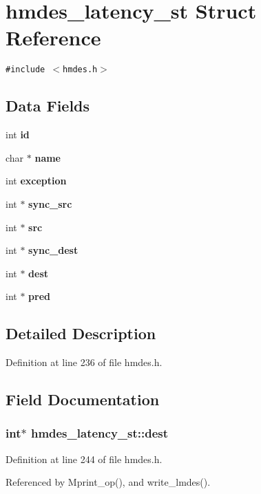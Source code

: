 \section{hmdes\_\-latency\_\-st Struct Reference}
\label{structhmdes__latency__st}
{\tt \#include $<$hmdes.h$>$}

\subsection*{Data Fields}
\begin{CompactItemize}
\item 
int \bf{id}
\item 
char $\ast$ \bf{name}
\item 
int \bf{exception}
\item 
int $\ast$ \bf{sync\_\-src}
\item 
int $\ast$ \bf{src}
\item 
int $\ast$ \bf{sync\_\-dest}
\item 
int $\ast$ \bf{dest}
\item 
int $\ast$ \bf{pred}
\end{CompactItemize}


\subsection{Detailed Description}




Definition at line 236 of file hmdes.h.

\subsection{Field Documentation}
\subsubsection{\setlength{\rightskip}{0pt plus 5cm}int$\ast$ \bf{hmdes\_\-latency\_\-st::dest}}\label{structhmdes__latency__st_82cb8a6b2061340b09195b92aa9fa7ed}




Definition at line 244 of file hmdes.h.

Referenced by Mprint\_\-op(), and write\_\-lmdes().
